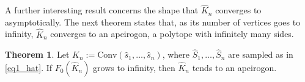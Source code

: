 \documentclass[12pt, reqno]{amsart}
\theoremstyle{definition}
\newtheorem{theorem}{Theorem}%
\newtheorem{lemma}[theorem]{Lemma}
\begin{document}
A further interesting result concerns the shape that $\hat{K}_n$ converges to asymptotically. The next theorem states that, as its number of vertices goes to infinity,  $\hat{K}_n$ converges to an apeirogon, a polytope with infinitely many sides.






\begin{theorem}\label{hullconv}
Let $\hat{K}_n :=\text{Conv}(\hat{s}_1,\ldots,\hat{s}_{n})$, where $\hat{S}_1,\ldots,\hat{S}_{n}$ are sampled as in \eqref{eq1_hat}. If $F_0(\hat{K}_n)$ grows to infinity, then $\hat{K}_n$ tends to an apeirogon.
\end{theorem}
\fi
\end{document}
